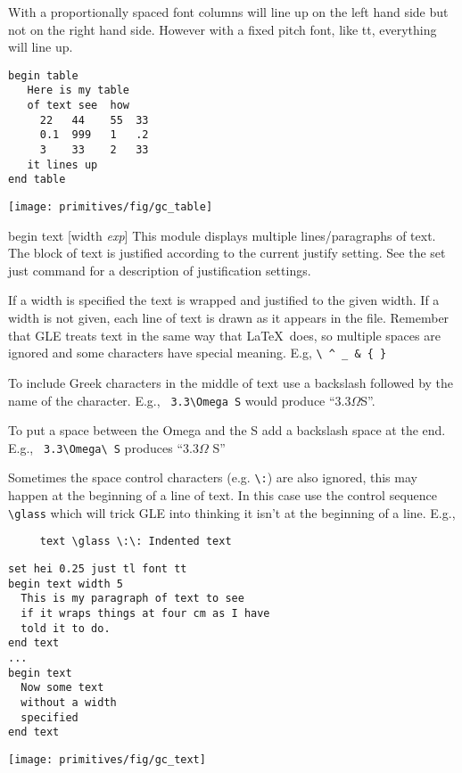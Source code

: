 \begin{commanddescription}
With a proportionally spaced font columns will line
up on the left hand side but not on the right hand side.
However with a fixed pitch font, like {\sf tt},
everything will line up.

\begin{minipage}[c]{8cm}
\begin{Verbatim}
begin table 
   Here is my table
   of text see  how 
     22   44    55  33
     0.1  999   1   .2
     3    33    2   33
   it lines up
end table
\end{Verbatim}
\end{minipage}
\hfill
\begin{minipage}[c]{7cm}
\mbox{\texttt{[image: primitives/fig/gc\_table]}}
\end{minipage}

\item[{\sf begin text [width {\it exp}] }  ]
 This module displays multiple lines/paragraphs of text.
The block of text is justified according to the current justify setting.
See the {\sf set just} command for a description of justification settings.

If a width is specified the text is wrapped and justified
to the given width.  If a width is not given, each line of text
is drawn as it appears in the file.  Remember that GLE treats
text in the same way that \LaTeX \ does, so multiple spaces are ignored
and some characters have special meaning. E.g, \verb#\ ^ _ & { }#

To include Greek characters in the middle of text use a
backslash followed by the name of the character.
E.g., \verb+ 3.3\Omega S+ would produce ``3.3$\Omega$S''.

To put a space between the Omega and the S add a
backslash space at the end. E.g.,  \verb+ 3.3\Omega\ S+
produces ``3.3$\Omega$ S''

Sometimes the space control characters (e.g. \verb+\:+)
are also ignored, this may
happen at the beginning of a line of text. In this case use the
control sequence \verb+\glass+ which will trick GLE into
thinking it isn't at the beginning of a line. E.g.,

\preglecode{}
\begin{Verbatim}
     text \glass \:\: Indented text
\end{Verbatim}
\postglecode{}

\begin{minipage}[c]{8cm}
\begin{Verbatim}
set hei 0.25 just tl font tt
begin text width 5
  This is my paragraph of text to see
  if it wraps things at four cm as I have 
  told it to do.
end text 
...
begin text 
  Now some text 
  without a width
  specified
end text 
\end{Verbatim}
\end{minipage}
\hfill
\begin{minipage}[c]{7cm}
\mbox{\texttt{[image: primitives/fig/gc\_text]}}
\end{minipage}


\end{commanddescription}
